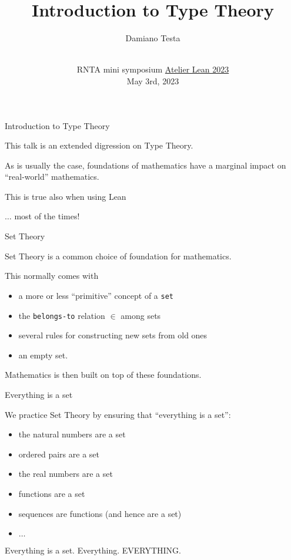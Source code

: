 \documentclass{beamer}
\title{Introduction to Type Theory}
\author{Damiano Testa}
\institute[]{University of Warwick}
\date[\href{http://www.rnta.eu/7MSRNTA/lean.html}{Atelier Lean 2023}]{\\
\vspace{50pt}
RNTA mini symposium
\href{http://www.rnta.eu/7MSRNTA/lean.html}{Atelier Lean 2023}\\
\vspace{20pt}
May 3rd, 2023
}
\begin{document}
\frame{\titlepage}

\begin{frame}[fragile]
{Introduction to Type Theory}

This talk is an extended digression on Type Theory.

As is usually the case, foundations of mathematics have a marginal impact on ``real-world'' mathematics.

This is true also when using Lean

$\ldots$ most of the times!
\end{frame}

\begin{frame}[fragile]{Set Theory}

Set Theory is a common choice of foundation for mathematics.

This normally comes with

\vspace{-18pt}
\begin{itemize}
\setlength\itemsep{-18pt}
\item
  a more or less ``primitive'' concept of a {\color{violet}\verb`set`}
\item
  the {\color{violet}\verb`belongs-to`} relation $\in$ among sets
\item
  several rules for constructing new sets from old ones
\item
  an empty set.
\end{itemize}

Mathematics is then built on top of these foundations.
\end{frame}

\begin{frame}[fragile]{Everything is a set}

We practice Set Theory by ensuring that ``everything is a set'':

\vspace{-18pt}
\begin{itemize}
\setlength\itemsep{-18pt}
\item
  the natural numbers are a set
\item
  ordered pairs are a set
\item
  the real numbers are a set
\item
  functions are a set
\item
  sequences are functions (and hence are a set)
\item
  $\ldots$
\end{itemize}

Everything is a set. Everything. EVERYTHING.
\end{frame}
\end{document}
